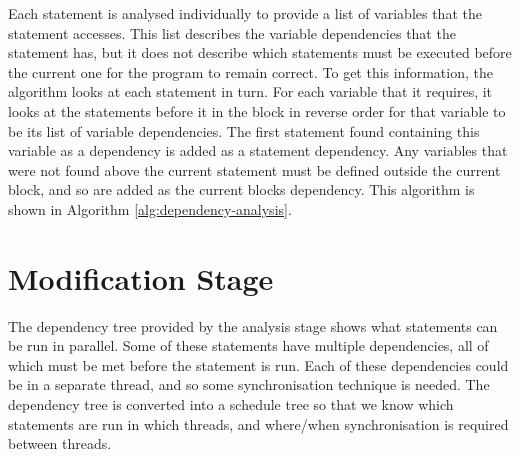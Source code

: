 Each statement is analysed individually to provide a list of variables that the statement accesses. This list describes the variable dependencies that the statement has, but it does not describe which statements must be executed before the current one for the program to remain correct. To get this information, the algorithm looks at each statement in turn. For each variable that it requires, it looks at the statements before it in the block in reverse order for that variable to be its list of variable dependencies. The first statement found containing this variable as a dependency is added as a statement dependency. Any variables that were not found above the current statement must be defined outside the current block, and so are added as the current blocks dependency. This algorithm is shown in Algorithm \autoref{alg:dependency-analysis}.


\section{Modification Stage}

The dependency tree provided by the analysis stage shows what statements can be run in parallel. Some of these statements have multiple dependencies, all of which must be met before the statement is run. Each of these dependencies could be in a separate thread, and so some synchronisation technique is needed. The dependency tree is converted into a schedule tree so that we know which statements are run in which threads, and where/when synchronisation is required between threads.

